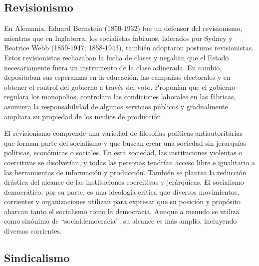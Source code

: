 \documentclass[
  jou,
  floatsintext,
  longtable,
  a4paper,
  nolmodern,
  notxfonts,
  notimes,
  12pt,
  colorlinks=true,linkcolor=blue,citecolor=blue,urlcolor=blue]{apa7}
\begin{document}
\subsection{Revisionismo}\label{revisionismo}

En Alemania, Eduard Bernstein (1850-1932) fue un defensor del
revisionismo, mientras que en Inglaterra, los socialistas fabianos,
liderados por Sydney y Beatrice Webb (1859-1947; 1858-1943), también
adoptaron posturas revisionistas. Estos revisionistas rechazaban la
lucha de clases y negaban que el Estado necesariamente fuera un
instrumento de la clase adinerada. En cambio, depositaban sus esperanzas
en la educación, las campañas electorales y en obtener el control del
gobierno a través del voto. Proponían que el gobierno regulara los
monopolios, controlara las condiciones laborales en las fábricas,
asumiera la responsabilidad de algunos servicios públicos y gradualmente
ampliara su propiedad de los medios de producción.

El revisionismo comprende una variedad de filosofías políticas
antiautoritarias que forman parte del socialismo y que buscan crear una
sociedad sin jerarquías políticas, económicas o sociales. En esta
sociedad, las instituciones violentas o coercitivas se disolverían, y
todas las personas tendrían acceso libre e igualitario a las
herramientas de información y producción. También se plantea la
reducción drástica del alcance de las instituciones coercitivas y
jerárquicas. El socialismo democrático, por su parte, es una ideología
crítica que diversos movimientos, corrientes y organizaciones utilizan
para expresar que su posición y propósito abarcan tanto el socialismo
como la democracia. Aunque a menudo se utiliza como sinónimo de
``socialdemocracia'', su alcance es más amplio, incluyendo diversas
corrientes.

\subsection{Sindicalismo}\label{sindicalismo}
\end{document}
